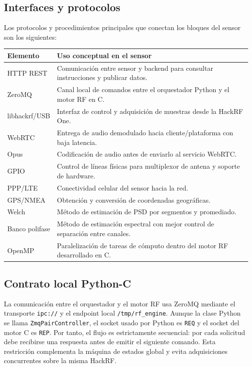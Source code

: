 \subsection{Interfaces y protocolos}

Los protocolos y procedimientos principales que conectan los bloques del sensor
son los siguientes:

\begin{longtable}{p{}p{}}
\toprule
\textbf{Elemento} & \textbf{Uso conceptual en el sensor} \\
\midrule
\endhead
HTTP REST & Comunicación entre sensor y backend para consultar instrucciones y publicar datos. \\
ZeroMQ & Canal local de comandos entre el orquestador Python y el motor RF en C. \\
libhackrf/USB & Interfaz de control y adquisición de muestras desde la HackRF One. \\
WebRTC & Entrega de audio demodulado hacia cliente/plataforma con baja latencia. \\
Opus & Codificación de audio antes de enviarlo al servicio WebRTC. \\
GPIO & Control de líneas físicas para multiplexor de antena y soporte de hardware. \\
PPP/LTE & Conectividad celular del sensor hacia la red. \\
GPS/NMEA & Obtención y conversión de coordenadas geográficas. \\
Welch & Método de estimación de PSD por segmentos y promediado. \\
Banco polifase & Método de estimación espectral con mejor control de separación entre canales. \\
OpenMP & Paralelización de tareas de cómputo dentro del motor RF desarrollado en C. \\
\bottomrule
\end{longtable}

\subsection{Contrato local Python-C}

La comunicación entre el orquestador y el motor RF usa ZeroMQ mediante el
transporte \texttt{ipc://} y el endpoint local \texttt{/tmp/rf\_engine}. Aunque la clase Python se llama
\texttt{ZmqPairController}, el socket usado por Python es \texttt{REQ} y el socket
del motor C es \texttt{REP}. Por tanto, el flujo es estrictamente secuencial: por
cada solicitud debe recibirse una respuesta antes de emitir el siguiente comando.
Esta restricción complementa la máquina de estados global y evita adquisiciones
concurrentes sobre la misma HackRF.

